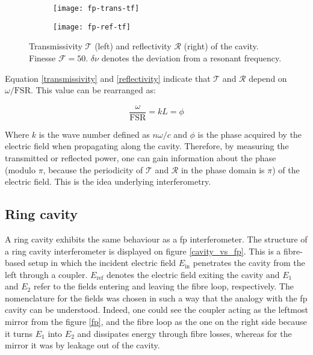 \begin{figure}[h]
	\centering
	\begin{subfigure}{.5\textwidth}
		\centering
		\texttt{[image: fp-trans-tf]}
	\end{subfigure}%
	\begin{subfigure}{.5\textwidth}
		\centering
		\texttt{[image: fp-ref-tf]}
	\end{subfigure}
	\caption{Transmissivity $\mathcal{T}$ (left) and reflectivity $\mathcal{R}$ (right) of the cavity. Finesse $\mathcal{F}=50$. $\delta \nu$ denotes the deviation from a resonant frequency.}
	\label{fp-tf}
\end{figure}

Equation \eqref{transmissivity} and \eqref{reflectivity} indicate that $\mathcal{T}$ and $\mathcal{R}$ depend on $\omega/\text{FSR}$. This value can be rearranged as:

\begin{equation}
	\frac{\omega}{\text{FSR}} = kL = \phi
\end{equation}

Where $k$ is the wave number defined as $n \omega/c$ and $\phi$ is the phase acquired by the electric field when propagating along the cavity. Therefore, by measuring the transmitted or reflected power, one can gain information about the phase (modulo $\pi$, because the periodicity of $\mathcal{T}$ and $\mathcal{R}$ in the phase domain is $\pi$) of the electric field. This is the idea underlying interferometry.


\subsection{Ring cavity}

\label{subsec-ring-cavity}

A ring cavity exhibits the same behaviour as a \gls{fp} interferometer. The structure of a ring cavity interferometer is displayed on figure \ref{cavity_vs_fp}. This is a fibre-based setup in which the incident electric field $E_{\text{in}}$ penetrates the cavity from the left through a coupler. $E_{\text{ref}}$ denotes the electric field exiting the cavity and $E_1$ and $E_2$ refer to the fields entering and leaving the fibre loop, respectively. The nomenclature for the fields was chosen in such a way that the analogy with the \gls{fp} cavity can be understood. Indeed, one could see the coupler acting as the leftmost mirror from the figure \ref{fp}, and the fibre loop as the one on the right side because it turns $E_1$ into $E_2$ and dissipates energy through fibre losses, whereas for the mirror it was by leakage out of the cavity.


